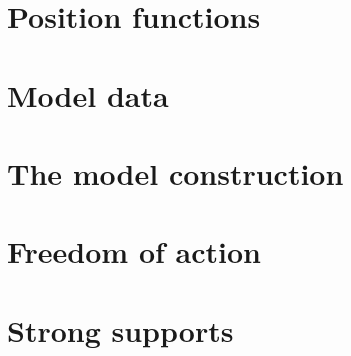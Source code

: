 \documentclass{book}
\begin{document}
\chapter{Position functions}

\minitoc
\newpage





\chapter{Model data}

\minitoc
\newpage









\chapter{The model construction}

\minitoc
\newpage




\chapter{Freedom of action}

\minitoc
\newpage












\chapter{Strong supports}

\minitoc
\newpage






\end{document}
